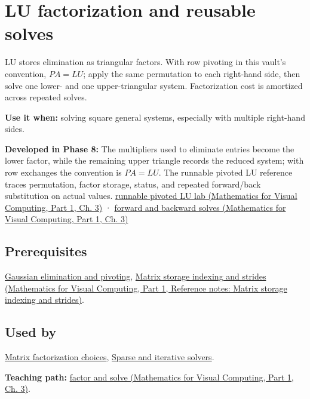 \hypertarget{appendix-55e4b5b0a1e6}{}\label{referencestart:appendix-55e4b5b0a1e6}
\section{LU factorization and reusable solves}\label{appendix-55e4b5b0a1e6-lu-factorization-and-reusable-solves}

\hypertarget{appendix-55e4b5b0a1e6-lu-factorization-and-reusable-solves}{}

LU stores elimination as triangular factors. With row pivoting in this vault's convention, \(PA=LU\); apply the same permutation to each right-hand side, then solve one lower- and one upper-triangular system. Factorization cost is amortized across repeated solves.

\textbf{Use it when:} solving square general systems, especially with multiple right-hand sides.

\textbf{Developed in Phase 8:} The multipliers used to eliminate entries become the lower factor, while the remaining upper triangle records the reduced system; with row exchanges the convention is \(PA=LU\). The runnable pivoted LU reference traces permutation, factor storage, status, and repeated forward/back substitution on actual values. \href{../02-Mathematics-for-Visual-Computing-P01/main.pdf\#01-foundations-i-ch019-a-runnable-pivoted-lu-reference-preserves-the-elimination-history}{runnable pivoted LU lab (Mathematics for Visual Computing, Part 1, Ch. 3)} · \href{../02-Mathematics-for-Visual-Computing-P01/main.pdf\#01-foundations-i-ch019-triangular-solves-perform-the-cheap-second-half}{forward and backward solves (Mathematics for Visual Computing, Part 1, Ch. 3)}

\subsection{Prerequisites}\label{appendix-55e4b5b0a1e6-prerequisites}

\hypertarget{appendix-55e4b5b0a1e6-prerequisites}{}

\hyperref[appendix-f6e77f4a200f]{Gaussian elimination and pivoting}, \href{../02-Mathematics-for-Visual-Computing-P01/main.pdf\#appendix-ffdc1d4e5350}{Matrix storage indexing and strides (Mathematics for Visual Computing, Part 1, Reference notes: Matrix storage indexing and strides)}.

\subsection{Used by}\label{appendix-55e4b5b0a1e6-used-by}

\hypertarget{appendix-55e4b5b0a1e6-used-by}{}

\hyperref[appendix-221a483bec2d]{Matrix factorization choices}, \hyperref[appendix-67c87a3d9e94]{Sparse and iterative solvers}.

\textbf{Teaching path:} \href{../02-Mathematics-for-Visual-Computing-P01/main.pdf\#01-foundations-i-ch019-elimination-turns-the-geometry-into-an-auditable-calculation}{factor and solve (Mathematics for Visual Computing, Part 1, Ch. 3)}.

